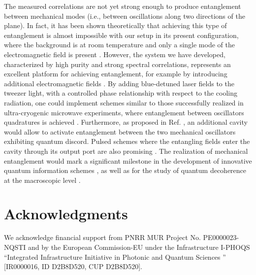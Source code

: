 \documentclass[11pt,floatfix,amssymb,prx,aps,longbibliography,superscriptaddress,nopacs]{revtex4-2}
\begin{document}
The measured correlations are not yet strong enough to produce entanglement between mechanical modes (i.e., between oscillations along two directions of the plane). In fact, it has been shown theoretically that achieving this type of entanglement is almost impossible with our setup in its present configuration, where the background is at room temperature and only a single mode of the electromagnetic field is present \cite{Vitali2007,Genes2008}. However, the system we have developed, characterized by high purity and strong spectral correlations, represents an excellent platform for achieving entanglement, for example by introducing additional electromagnetic fields \cite{Hartmann2008,Li2015}. By adding blue-detuned laser fields to the tweezer light, with a controlled phase relationship with respect to the cooling radiation, one could implement schemes similar to those successfully realized in ultra-cryogenic microwave experiments, where entanglement between oscillators quadratures is achieved \cite{Ockeloen-Korppi2018,Kotler2021,Mercier2021}. Furthermore, as proposed in Ref. \cite{Mazzola2011}, an additional cavity would allow to activate entanglement between the two mechanical oscillators exhibiting quantum discord. Pulsed schemes where the entangling fields enter the cavity through its output port are also promising \cite{Rakhubovsky2020}.
The realization of mechanical entanglement would mark a significant milestone in the development of innovative quantum information schemes \cite{Weedbrook2012}, as well as for the study of quantum decoherence at the macroscopic level \cite{Marshall2003,Bassi2013,Gasbarri2021}.

\section*{Acknowledgments}
We acknowledge financial support from PNRR MUR Project No. PE0000023-NQSTI and by the European Commission-EU under the Infrastructure I-PHOQS “Integrated Infrastructure Initiative in Photonic and Quantum Sciences ” [IR0000016, ID D2B8D520, CUP D2B8D520].









% 
%
\end{document}
